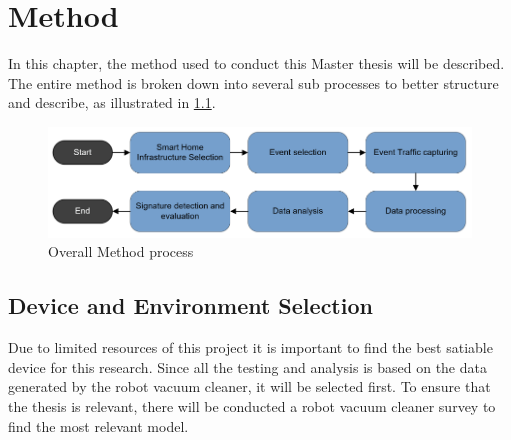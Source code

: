 \chapter{Method}
\label{cap:Method}

In this chapter, the method used to conduct this Master thesis will be described. The entire method is broken down into several sub processes to better structure and describe, as illustrated in  \ref{fig:Method_process}.  

\begin{figure}[H]
    \centering
    \includegraphics[width=\textwidth]{figures/Method_process.png}
    \caption{Overall Method process}
    \label{fig:Method_process}
\end{figure}



\section{Device and Environment Selection}
Due to limited resources of this project it is important to find the best satiable device for this research. Since all the testing and analysis is based on the data generated by the robot vacuum cleaner, it will be selected first. To ensure that the thesis is relevant, there will be conducted a robot vacuum cleaner survey to find the most relevant model.

